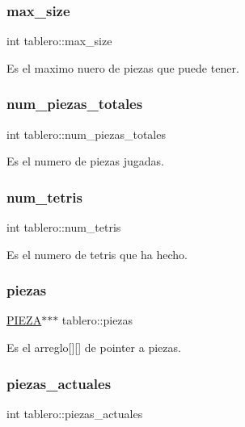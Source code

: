 \subsubsection{\texorpdfstring{max\+\_\+size}{max\_size}}
{\footnotesize\ttfamily int tablero\+::max\+\_\+size}

Es el maximo nuero de piezas que puede tener. \mbox{\label{structtablero_a2ee1e90ac1b8c4b7d5bf99066da856b9}} 
\subsubsection{\texorpdfstring{num\+\_\+piezas\+\_\+totales}{num\_piezas\_totales}}
{\footnotesize\ttfamily int tablero\+::num\+\_\+piezas\+\_\+totales}

Es el numero de piezas jugadas. \mbox{\label{structtablero_a840da43b4c79754ed941a715e18fa52c}} 
\subsubsection{\texorpdfstring{num\+\_\+tetris}{num\_tetris}}
{\footnotesize\ttfamily int tablero\+::num\+\_\+tetris}

Es el numero de tetris que ha hecho. \mbox{\label{structtablero_a7f2c766900f894561abf23f3fc34662b}} 
\subsubsection{\texorpdfstring{piezas}{piezas}}
{\footnotesize\ttfamily \hyperlink{pieza_8h_aac4b603fd85c8ae53529fc00a88de8ae}{P\+I\+E\+ZA}$\ast$$\ast$$\ast$ tablero\+::piezas}

Es el arreglo\mbox{[}\mbox{]}\mbox{[}\mbox{]} de pointer a piezas. \mbox{\label{structtablero_afae3a3203985d0fe80570051832b3e04}} 
\subsubsection{\texorpdfstring{piezas\+\_\+actuales}{piezas\_actuales}}
{\footnotesize\ttfamily int tablero\+::piezas\+\_\+actuales}

